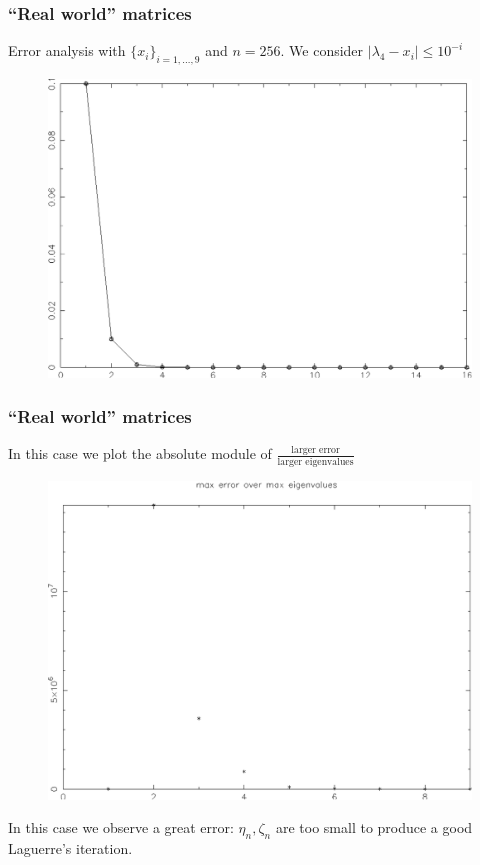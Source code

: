 \documentclass{beamer}
\theoremstyle{definition} \newtheorem{de}{Def}
\theoremstyle{remark} \newtheorem{os}[de]{Remark}
\theoremstyle{plain} \newtheorem{te}[de]{Teo}
\theoremstyle{plain} \newtheorem{co}[de]{Cor}
\theoremstyle{plain} \newtheorem{pr}[de]{Prop}
\theoremstyle{plain} \newtheorem{lem}[de]{Lemm}
\theoremstyle{remark} \newtheorem{rem}[de]{Remark}
\begin{document}
\begin{frame}
  \frametitle{``Real world'' matrices}

  Error analysis with $\{ x_i \}_{i=1,\dots,9}$ and $n=256$. We consider $|\lambda_4 - x_i|\le 10^{-i}$

  \begin{figure}
    \centering
    \includegraphics[scale=0.3]{images/ConfrontoLagItInerziaKappa_Sturm.pdf}
  \end{figure}

\end{frame}


\begin{frame}
  \frametitle{``Real world'' matrices}

  In this case we plot the absolute module of $\frac{\text{larger error}}{\text{larger eigenvalues}}$ 

  \begin{figure}
    \centering
    \includegraphics[scale=0.3]{images/Errori_SturmLiouville_9.pdf}
  \end{figure}

In this case we observe a great error: $\eta_n,\zeta_n$ are too small to produce a good Laguerre's iteration. 

\end{frame}
\end{document}
